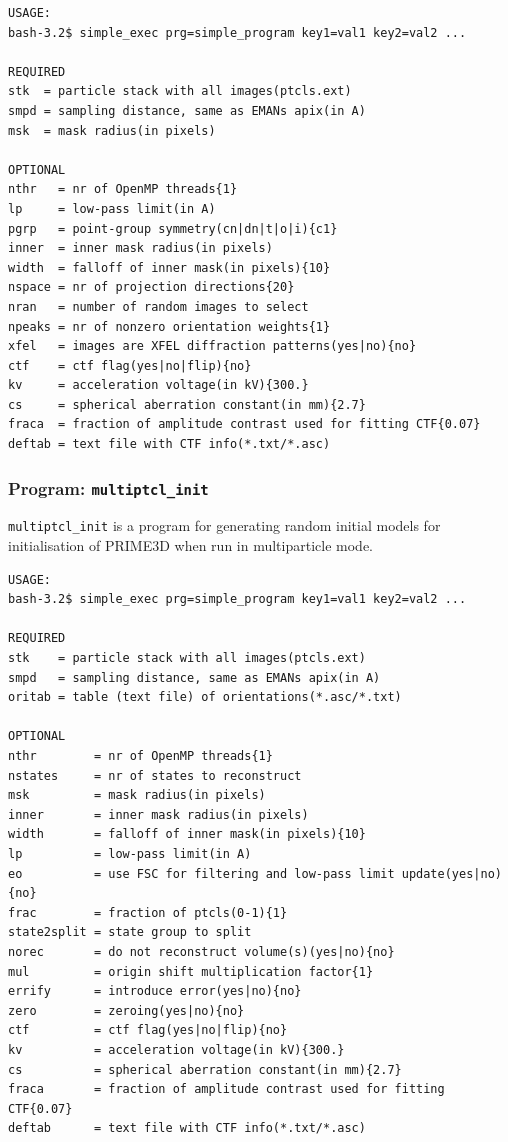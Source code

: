 \documentclass[a4paper,11pt]{article}
\newcommand{\prgname}[1]{\textcolor{NavyBlue}{\texttt{#1}}}
\begin{document}
\begin{verbatim}
USAGE:
bash-3.2$ simple_exec prg=simple_program key1=val1 key2=val2 ...

REQUIRED
stk  = particle stack with all images(ptcls.ext)
smpd = sampling distance, same as EMANs apix(in A)
msk  = mask radius(in pixels)

OPTIONAL
nthr   = nr of OpenMP threads{1}
lp     = low-pass limit(in A)
pgrp   = point-group symmetry(cn|dn|t|o|i){c1}
inner  = inner mask radius(in pixels)
width  = falloff of inner mask(in pixels){10}
nspace = nr of projection directions{20}
nran   = number of random images to select
npeaks = nr of nonzero orientation weights{1}
xfel   = images are XFEL diffraction patterns(yes|no){no}
ctf    = ctf flag(yes|no|flip){no}
kv     = acceleration voltage(in kV){300.}
cs     = spherical aberration constant(in mm){2.7}
fraca  = fraction of amplitude contrast used for fitting CTF{0.07}
deftab = text file with CTF info(*.txt/*.asc)
\end{verbatim}

\subsubsection{Program: \prgname{multiptcl\_init}}
\label{multiptcl_init}
\prgname{multiptcl\_init} is a program for generating random initial models for initialisation of PRIME3D when run in multiparticle mode.

\begin{verbatim}
USAGE:
bash-3.2$ simple_exec prg=simple_program key1=val1 key2=val2 ...

REQUIRED
stk    = particle stack with all images(ptcls.ext)
smpd   = sampling distance, same as EMANs apix(in A)
oritab = table (text file) of orientations(*.asc/*.txt)

OPTIONAL
nthr        = nr of OpenMP threads{1}
nstates     = nr of states to reconstruct
msk         = mask radius(in pixels)
inner       = inner mask radius(in pixels)
width       = falloff of inner mask(in pixels){10}
lp          = low-pass limit(in A)
eo          = use FSC for filtering and low-pass limit update(yes|no){no}
frac        = fraction of ptcls(0-1){1}
state2split = state group to split
norec       = do not reconstruct volume(s)(yes|no){no}
mul         = origin shift multiplication factor{1}
errify      = introduce error(yes|no){no}
zero        = zeroing(yes|no){no}
ctf         = ctf flag(yes|no|flip){no}
kv          = acceleration voltage(in kV){300.}
cs          = spherical aberration constant(in mm){2.7}
fraca       = fraction of amplitude contrast used for fitting CTF{0.07}
deftab      = text file with CTF info(*.txt/*.asc)
\end{verbatim}
\end{document}
